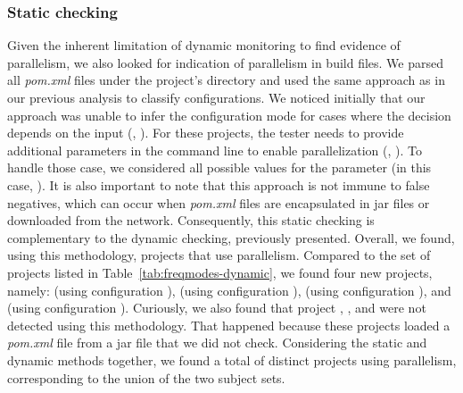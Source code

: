 \subsubsection{Static checking}
\label{sec:rqC-2}
Given the inherent limitation of dynamic monitoring to find evidence
of parallelism, we also looked for indication of parallelism in build
files.  We
parsed all \emph{pom.xml} files under the project's directory and used
the same approach as in our previous analysis to classify
configurations.  We noticed initially that our approach was unable to
infer the configuration mode for cases where the decision depends on
the input (\eg,
). For these
projects, the tester needs to provide additional parameters in the
command line to enable parallelization (\eg, ). To handle those case, we
considered all possible values for the parameter (in this case,
).  It is also important to note that this
approach is not immune to false negatives, which can occur when
\emph{pom.xml} files are encapsulated in jar files or downloaded from
the network.  Consequently, this static checking is complementary to
the dynamic checking, previously presented.
Overall, we found, using this methodology, \numProjectsParStatic{}
projects that use parallelism.
Compared to the set of projects listed in
Table~\ref{tab:freqmodes-dynamic}, we found four new projects, namely:
 (using
configuration \ParClassParMeth),  (using configuration
\ForkSeq{}),  (using configuration \ForkSeq), and
 (using configuration \ParClassParMeth).
Curiously, we also found that project , ,
and  were not detected using this methodology.
That happened because these projects loaded a \emph{pom.xml} file from
a jar file that we did not check.  Considering the static and dynamic
methods together, we found a total of \numProjectsParTotal{} distinct
projects using parallelism, corresponding to the union of the two
subject sets.

\vspace{1ex}
\begin{center}
\end{center}
\vspace{1ex}


